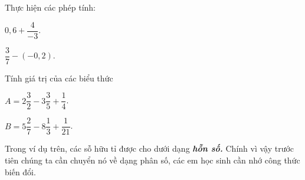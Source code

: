 \begin{vd}%
Thực hiện các phép tính:
\begin{enumEX}{2}
	\item $0{,}6+\dfrac{4}{-3}$.
	\item $\dfrac{3}{7}-(-0{,}2)$.
	\end{enumEX}
\end{vd}

\begin{vd}%
	Tính giá trị của các biểu thức
	\begin{enumEX}{2}
		\item $A=2\dfrac{3}{2}-3\dfrac{3}{5}+\dfrac{1}{4}$.
		\item $B=5\dfrac{2}{7}-8\dfrac{1}{3}+\dfrac{1}{21}$.
	\end{enumEX}

\end{vd}

\begin{nx}
Trong ví dụ trên, các sỗ hữu tỉ được cho dưới dạng \textbf{\textit{hỗn số.}} Chính vì vậy trước tiên chúng ta cần chuyển nó về dạng phân số, các em học sinh cần nhớ công thức biến đổi.
\end{nx}

